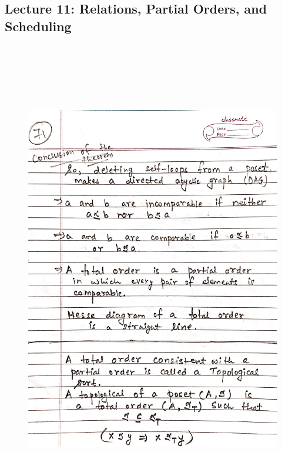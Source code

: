 \newpage
{\color{black} \subsection*{Lecture 11: Relations, Partial Orders, and Scheduling}}
\begin{figure}[H]
    \centering
    \includegraphics[width=16cm, height=21cm]{"./MIT-6.042J/MIT-6042J-071"}
\end{figure}

